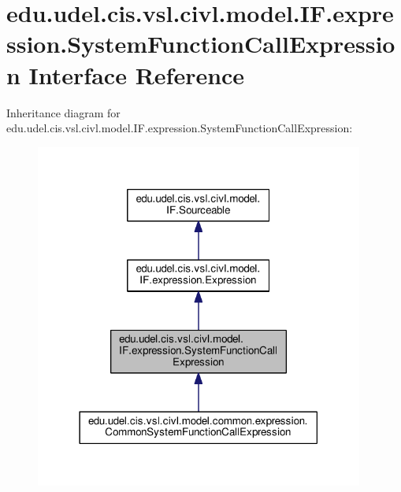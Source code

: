 \hypertarget{interfaceedu_1_1udel_1_1cis_1_1vsl_1_1civl_1_1model_1_1IF_1_1expression_1_1SystemFunctionCallExpression}{}\section{edu.\+udel.\+cis.\+vsl.\+civl.\+model.\+I\+F.\+expression.\+System\+Function\+Call\+Expression Interface Reference}
\label{interfaceedu_1_1udel_1_1cis_1_1vsl_1_1civl_1_1model_1_1IF_1_1expression_1_1SystemFunctionCallExpression}


Inheritance diagram for edu.\+udel.\+cis.\+vsl.\+civl.\+model.\+I\+F.\+expression.\+System\+Function\+Call\+Expression\+:
\nopagebreak
\begin{figure}[H]
\begin{center}
\leavevmode
\includegraphics[width=306pt]{interfaceedu_1_1udel_1_1cis_1_1vsl_1_1civl_1_1model_1_1IF_1_1expression_1_1SystemFunctionCallExpression__inherit__graph}
\end{center}
\end{figure}


